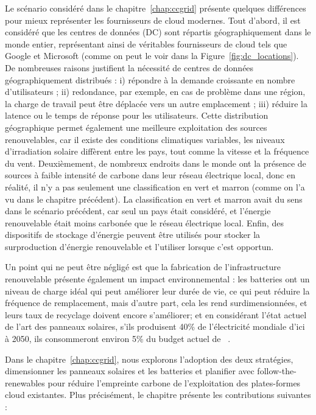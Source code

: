 Le scénario considéré dans le chapitre~\ref{chap:ccgrid} présente quelques différences pour mieux représenter les fournisseurs de cloud modernes. Tout d'abord, il est considéré que les centres de données (DC) sont répartis géographiquement dans le monde entier, représentant ainsi de véritables fournisseurs de cloud tels que Google et Microsoft (comme on peut le voir dans la Figure~\ref{fig:dc_locations}). De nombreuses raisons justifient la nécessité de centres de données géographiquement distribués : i) répondre à la demande croissante en nombre d'utilisateurs ; ii) redondance, par exemple, en cas de problème dans une région, la charge de travail peut être déplacée vers un autre emplacement ; iii) réduire la latence ou le temps de réponse pour les utilisateurs. Cette distribution géographique permet également une meilleure exploitation des sources renouvelables, car il existe des conditions climatiques variables, les niveaux d'irradiation solaire diffèrent entre les pays, tout comme la vitesse et la fréquence du vent. Deuxièmement, de nombreux endroits dans le monde ont la présence de sources à faible intensité de carbone dans leur réseau électrique local, donc en réalité, il n'y a pas seulement une classification en vert et marron (comme on l'a vu dans le chapitre précédent). La classification en vert et marron avait du sens dans le scénario précédent, car seul un pays était considéré, et l'énergie renouvelable était moins carbonée que le réseau électrique local. Enfin, des dispositifs de stockage d'énergie peuvent être utilisés pour stocker la surproduction d'énergie renouvelable et l'utiliser lorsque c'est opportun.


Un point qui ne peut être négligé est que la fabrication de l'infrastructure renouvelable présente également un impact environnemental : les batteries ont un niveau de charge idéal qui peut améliorer leur durée de vie, ce qui peut réduire la fréquence de remplacement, mais d'autre part, cela les rend surdimensionnées\cite{batteries_baumman}, et leurs taux de recyclage doivent encore s'améliorer\cite{bateries_RAHMAN}; et en considérant l'état actuel de l'art des panneaux solaires, s'ils produisent 40\% de l'électricité mondiale d'ici à 2050, ils consommeront environ 5\% du budget actuel de ~\cite{solar_co2}.

Dans le chapitre~\ref{chap:ccgrid}, nous explorons l'adoption des deux stratégies, dimensionner les panneaux solaires et les batteries et planifier avec follow-the-renewables pour réduire l'empreinte carbone de l'exploitation des plates-formes cloud existantes. Plus précisément, le chapitre présente les contributions suivantes :

